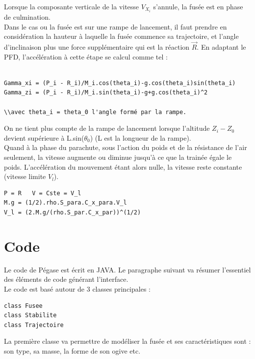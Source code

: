 \documentclass[a4paper]{article}
\begin{document}
Lorsque la composante verticale de la vitesse $V_{X_{i}}$ s'annule, la fusée est en phase de culmination.\\

Dans le cas ou la fusée est sur une rampe de lancement, il faut prendre en considération la hauteur à laquelle la fusée commence sa trajectoire, et l'angle d'inclinaison plus une force supplémentaire qui est la réaction {$\vec R$}. En adaptant le PFD, l'accélération à cette étape se calcul comme tel :
 
\begin{verbatim}

Gamma_xi = (P_i - R_i)/M_i.cos(theta_i)-g.cos(theta_i)sin(theta_i)
Gamma_zi = (P_i - R_i)/M_i.sin(theta_i)-g+g.cos(theta_i)^2	

\\avec theta_i = theta_0 l'angle formé par la rampe.

\end{verbatim}

On ne tient plus compte de la rampe de lancement lorsque l'altitude $Z_{i} - Z_{0}$ devient supérieure à L.sin($\theta_{0}$) (L est la longueur de la rampe).\\

Quand à la phase du parachute, sous l'action du poids et de la résistance de l'air seulement, la vitesse augmente ou diminue jusqu'à ce que la trainée égale le poids. L'accélération du mouvement étant alors nulle, la vitesse reste constante (vitesse limite $V_{l}$).
\begin{verbatim}
P = R   V = Cste = V_l 
M.g = (1/2).rho.S_para.C_x_para.V_l
V_l = (2.M.g/(rho.S_par.C_x_par))^(1/2)
\end{verbatim}


\section{Code}

Le code de Pégase est écrit en JAVA. Le paragraphe suivant va résumer l'essentiel des éléments de code générant l'interface.\\

Le code est basé autour de 3 classes principales :

\begin{verbatim}
class Fusee
class Stabilite
class Trajectoire	
\end{verbatim}


La première classe va permettre de modéliser la fusée et ses caractéristiques sont : son type, sa masse, la forme de son ogive etc.\\
\end{document}
